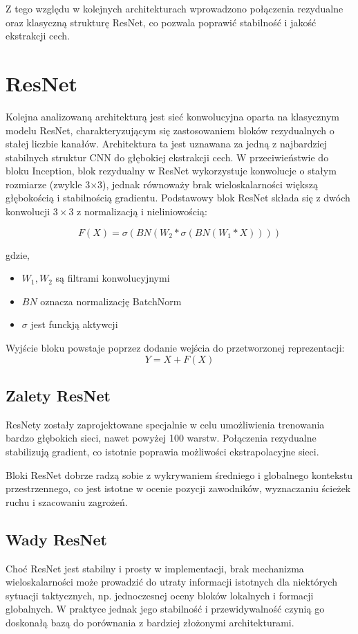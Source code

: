 Z tego względu w kolejnych architekturach wprowadzono połączenia rezydualne oraz klasyczną strukturę ResNet, co pozwala poprawić stabilność i jakość ekstrakcji cech.

\section{ResNet}
Kolejna analizowaną architekturą jest sieć konwolucyjna oparta na klasycznym modelu ResNet, charakteryzującym się zastosowaniem bloków rezydualnych o stałej liczbie kanałów. Architektura ta jest uznawana za jedną z najbardziej stabilnych struktur CNN do głębokiej ekstrakcji cech. 
W przeciwieństwie do bloku Inception, blok rezydualny w ResNet wykorzystuje konwolucje o stałym rozmiarze (zwykle 3×3), jednak równoważy brak wieloskalarności większą głębokością i stabilnością gradientu.
Podstawowy blok ResNet składa się z dwóch konwolucji $3 \times 3$ z normalizacją i nieliniowością:

\[F(X) = \sigma(BN(W_2 * \sigma(BN(W_1*X))))\]

gdzie,
\begin{itemize}
	\item $W_1, W_2$ są filtrami konwolucyjnymi
	\item $BN$ oznacza normalizację BatchNorm
	\item $\sigma$ jest funckją aktywcji
\end{itemize}

Wyjście bloku powstaje poprzez dodanie wejścia do przetworzonej reprezentacji:
\[Y = X + F(X)\]

\subsection*{Zalety ResNet}
ResNety zostały zaprojektowane specjalnie w celu umożliwienia trenowania bardzo głębokich sieci, nawet powyżej 100 warstw. Połączenia rezydualne stabilizują gradient, co istotnie poprawia możliwości ekstrapolacyjne sieci.

Bloki ResNet dobrze radzą sobie z wykrywaniem średniego i globalnego kontekstu przestrzennego, co jest istotne w ocenie pozycji zawodników, wyznaczaniu ścieżek ruchu i szacowaniu zagrożeń.


\subsection*{Wady ResNet}

Choć ResNet jest stabilny i prosty w implementacji, brak mechanizma wieloskalarności może prowadzić do utraty informacji istotnych dla niektórych sytuacji taktycznych, np. jednoczesnej oceny bloków lokalnych i formacji globalnych. W praktyce jednak jego stabilność i przewidywalność czynią go doskonałą bazą do porównania z bardziej złożonymi architekturami.

